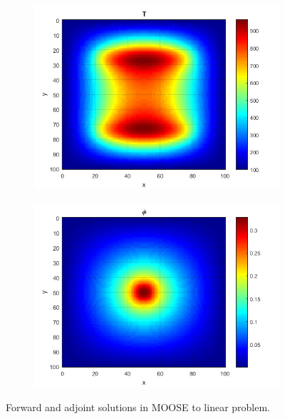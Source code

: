 \documentclass{article}
\begin{document}
\begin{figure}[H]
\label{sol1}
\centering
\begin{subfigure}{.5\textwidth}
  \centering
  \includegraphics[width=.98\linewidth]{nonlinear2T.png}
  \label{fig:sfig1}
\end{subfigure}%
\begin{subfigure}{.5\textwidth}
  \centering
  \includegraphics[width=.98\linewidth]{nonlinear2phi.png}
  \label{fig:sfig4}
\end{subfigure}%
\caption{Forward and adjoint solutions in MOOSE to linear problem.}
\end{figure}
\end{document}
